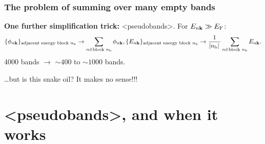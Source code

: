 \documentclass[t,aspectratio=169]{beamer}
\newcommand{\shortcode}[1]{\texttt{#1}}
\def\\{}%
\def\texttt#1{<#1>}%
\begin{document}
\begin{frame}
\frametitle{The problem of summing over many empty bands}


\textbf{One further simplification trick:} \shortcode{pseudobands}. 
For $E_{n \vb{k}} \gg E_{\text{F}}$:
\[
    \begin{aligned}
        \{ \phi_{n \vb{k}} \}_{\text{adjacent energy block $n_{\text{b}}$}} 
        \rightarrow \sum_{n \in \text{block $n_{\text{b}}$}} \phi_{n \vb{k}}, \\
        \{ E_{n \vb{k}} \}_{\text{adjacent energy block $n_{\text{b}}$}} \rightarrow
        \frac{1}{\abs*{n_{\text{b}}}}  \sum_{n \in \text{block $n_{\text{b}}$}} E_{n \vb{k}}.
    \end{aligned}
\]
4000 bands $\to$ $\sim 400$ to $\sim 1000$ bands.

\vspace{1cm}

\dots but is this snake oil? It makes no sense!!!

\end{frame}

\section{\shortcode{pseudobands}, and when it works}
\end{document}
